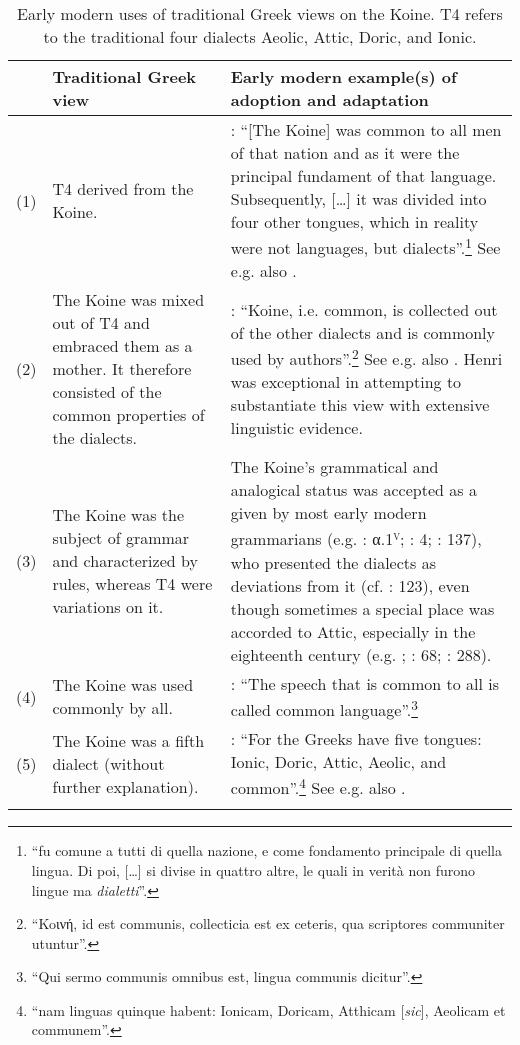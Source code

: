 {\begin{sidewaystable}\footnotesize
\caption{Early modern uses of traditional Greek views on the Koine. T4 refers to the traditional four dialects Aeolic, Attic, Doric, and Ionic.\label{tab:2.2}}
\begin{tabularx}{\textwidth}{l@{ }QQ}
\lsptoprule 
 & {Traditional Greek view} & Early modern example(s) of adoption and adaptation\\\midrule
 (1) & T4 derived from the Koine. & \citet[335]{Borghini1971}: “[The Koine] was common to all men of that nation and as it were the principal fundament of that language. Subsequently, […] it was divided into four other tongues, which in reality were not languages, but dialects”.\footnote{“fu comune a tutti di quella nazione, e come fondamento principale di quella lingua. Di poi, […] si divise in quattro altre, le quali in verità non furono lingue ma \textit{dialetti}”.} See e.g. also \citet[209]{Vergara1537}.\\
 (2) & The Koine was mixed out of T4 and embraced them as a mother. It therefore consisted of the common properties of the dialects. & \citet[52]{Oecolampadius1518}: “Koine, i.e. common, is collected out of the other dialects and is commonly used by authors”.\footnote{“Koινή, id est communis, collecticia est ex ceteris, qua scriptores communiter utuntur”.} See e.g. also \citet[10\textsc{\textsuperscript{r}}\textsc{–10}\textsc{\textsuperscript{v}}]{Girard1541}. Henri \citet[28--34]{Estienne1581} was exceptional in attempting to substantiate this view with extensive linguistic evidence.\\
 (3) & The Koine was the subject of grammar and characterized by rules, whereas T4 were variations on it. & The Koine’s grammatical and analogical status was accepted as a given by most early modern grammarians (e.g. \citealt{Gaza1495}: α.1\textsc{\textsuperscript{v}}; \citealt{Schmidt1604}: 4; \citealt{Walch1772}: 137), who presented the dialects as deviations from it (cf. \citealt{Ciccolella2008}: 123), even though sometimes a special place was accorded to Attic, especially in the eighteenth century (e.g. \citealt{Luscinius1517}; \citealt{Hemsterhuis1721}: 68; \citealt{Jehne1782}: 288).\\
 (4) & The Koine was used commonly by all. & \citet[a.i\textsc{\textsuperscript{v}}]{Melanchthon1518}: “The speech that is common to all is called common language”.\footnote{“Qui sermo communis omnibus est, lingua communis dicitur”.}\\
 (5) & The Koine was a fifth dialect (without further explanation). & \citet[138\textsc{\textsuperscript{v}}]{Beroaldo1493}: “For the Greeks have five tongues: Ionic, Doric, Attic, Aeolic, and common”.\footnote{“nam linguas quinque habent: Ionicam, Doricam, Atthicam [\textit{sic}], Aeolicam et communem”.} See e.g. also \citet[85\textsc{\textsuperscript{r}}]{Perotti1489}.\\
\lspbottomrule
\end{tabularx}
\end{sidewaystable}

}
